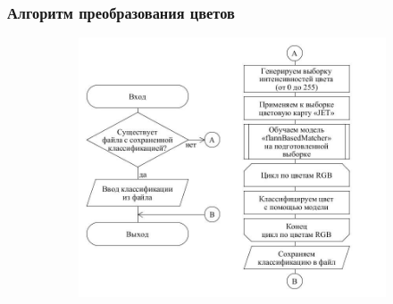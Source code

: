\documentclass[t]{beamer}
\begin{document}
	\begin{frame}
		\frametitle{Алгоритм преобразования цветов}
		\vspace*{-0.45cm}
		\begin{figure}[ht!]
			\begin{subfigure}{.62\textwidth}
				\centering
				\includegraphics[width = \textwidth]{image/chapter_2/colorclassification}
				\vspace*{-0.6cm}
				\caption{}
			\end{subfigure}
			\begin{subfigure}{.2\textwidth}
				\centering

\end{subfigure}
\end{figure}
\end{frame}
\end{document}

